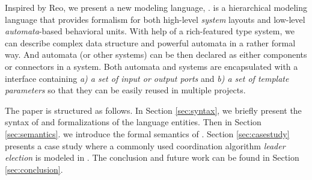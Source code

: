 
Inspired by Reo, we present a new modeling language, \lang{}. \lang{} is a hierarchical modeling language that provides formalism for both high-level \emph{system} layouts and low-level \emph{automata}-based behavioral units. With help of a rich-featured type system, we can describe complex data structure and powerful automata in a rather formal way. And automata (or other systems) can be then declared as either components or connectors in a system. Both automata and systems are encapsulated with a interface containing \emph{a) a set of input or output ports} and \emph{b) a set of template parameters} so that they can be easily reused in multiple projects. 

The paper is structured as follows. In Section \ref{sec:syntax}, we briefly present the syntax of \lang{} and formalizations of the language entities. Then in Section \ref{sec:semantics}. we introduce the formal semantics of \lang{}. Section \ref{sec:casestudy} presents a case study where a commonly used coordination algorithm \emph{leader election} is modeled in \lang{}. The conclusion and future work can be found in Section \ref{sec:conclusion}.